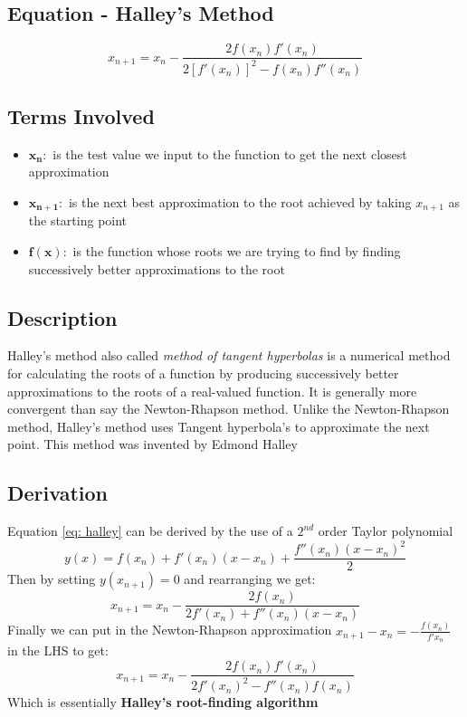 
\subsection{Equation - Halley's Method}

\begin{equation}
	\boxed{x_{n+1} = x_{n} - \frac{2f(x_{n})f'(x_{n})}  {2[f'(x_{n})]^2 - f(x_{n})f''(x_{n}) } }
	\label{eq: halley}
\end{equation}

\subsection{Terms Involved}
	\begin{itemize}
        	\item $\mathbf{x_{n}:}$ \indent is the test value we input to the function to get the  next closest approximation
        	\item $\mathbf{x_{n+1}:}$ \indent is the next best approximation to the root achieved by taking $ x_{n+1} $ as the starting point
        	\item $\mathbf{f(x):}$ \indent is the function whose roots we are trying to find by finding successively better approximations to the root
	\end{itemize}

\subsection{Description}
	\indent Halley's method also called \textit{method of tangent hyperbolas} is a numerical method for calculating the roots of a function by producing successively better approximations to the roots of 
		a real-valued function. It is generally more convergent than say the Newton-Rhapson method. Unlike the Newton-Rhapson method, Halley's method uses Tangent hyperbola's to approximate the next 
		point. This method was invented by Edmond Halley



\subsection{Derivation}
\indent Equation \ref{eq: halley} can be derived by the use of a $2^{nd}$ order Taylor polynomial
\begin{equation}
        y(x) = f(x_{n}) + f'(x_{n})(x-x_{n}) + \frac{f''(x_{n})(x-x_{n})^2}{2}
\end{equation}
Then by setting $y(x_{n+1}) = 0$ and rearranging we get:
\begin{equation}
        x_{n+1} = x_{n} - \frac{2f(x_{n})}{2f'(x_{n}) + f''(x_{n})(x-x_{n})}
\end{equation}
Finally we can put in the Newton-Rhapson approximation
\newline \indent $ x_{n+1}-x_{n} = -\frac{f(x_{n})}{f'{x_n}} $ in the LHS to get:
\begin{equation}
        x_{n+1} = x_{n} - \frac{2f(x_{n})f'(x_{n})}{2f'(x_{n})^2 - f''(x_{n})f(x_n)}
\end{equation}
Which is essentially \textbf{Halley's root-finding algorithm}

